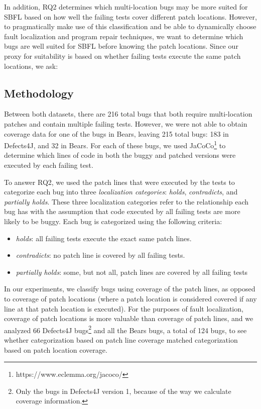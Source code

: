 \documentclass[10pt, conference]{IEEEtran}
\begin{document}
In addition, RQ2 determines which multi-location bugs may be more suited for SBFL 
based on how well the failing tests cover different patch locations. However, to pragmatically 
make use of this classification and be able to dynamically choose fault localization and program 
repair techniques, we want to determine which bugs are well suited for SBFL before knowing 
the patch locations. Since our proxy for suitability is based on whether failing tests execute 
the same patch locations, we ask:


\subsection{Methodology}

Between both datasets, there are 216 total bugs that both require multi-location
patches and contain multiple failing tests. However, we were not able to obtain coverage 
data for one of the bugs in Bears, leaving 215 total bugs: 183 in Defects4J, and 32 in
Bears. 
For each of these bugs, we used JaCoCo\footnote{https://www.eclemma.org/jacoco/}
to determine which lines of code in both the buggy and patched versions were executed
by each failing test.

To answer RQ2, we used the patch lines that were executed by the tests to categorize 
each bug into three \emph{localization categories}: \emph{holds}, \emph{contradicts}, and 
\emph{partially holds}. These three localization categories refer to the relationship each bug has 
with 
the assumption that code executed by all failing tests are more likely to be buggy. Each bug is 
categorized using the following criteria:

\begin{itemize}
\item \emph{holds}:  all failing tests execute the exact same patch lines.
\item \emph{contradicts}: no patch line is covered by all failing tests.
\item \emph{partially holds}: some, but not all, patch lines are covered by all failing tests
\end{itemize}

In our experiments, we classify bugs using coverage of the patch lines, as opposed to 
coverage of 
patch locations (where a patch location is considered covered if any line at that patch location 
is 
executed). For the purposes of fault localization, coverage of patch locations is more valuable 
than coverage of patch lines, and we analyzed 66 Defects4J bugs\footnote{Only the 
bugs in Defects4J version 1, because of the way we calculate coverage information.}
 and all the Bears bugs, a total of 124 bugs, to see whether categorization 
based on patch line 
coverage matched categorization based on patch location coverage.
\end{document}
